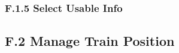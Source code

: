 \documentclass{template/openetcs_article}
\begin{document}
\subsubsection{F.1.5 Select Usable Info}


\subsection{F.2 Manage Train Position}





%
%
%
%



\end{document}
